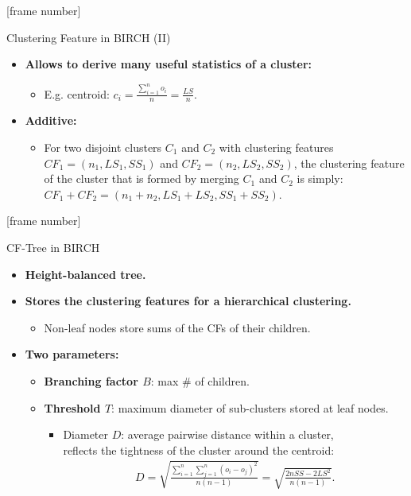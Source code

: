 \documentclass[aspectratio=169,t,xcolor=dvipsnames]{beamer}
\begin{document}
  { %
    [frame number]
    \begin{frame}{Clustering Feature in BIRCH (II)}
      \begin{itemize}
        \item \textbf{Allows to derive many useful statistics of a cluster:}
        \begin{itemize}
          \item E.g. centroid: $c_i = \frac{\sum_{i=1}^{n}o_i}{n} = \frac{LS}{n}$.
        \end{itemize}
        \item \textbf{Additive:}
        \begin{itemize}
          \item For two disjoint clusters $C_1$ and $C_2$ with clustering features $CF_1 = (n_1, LS_1, SS_1)$ and $CF_2 = (n_2, LS_2, SS_2)$, the clustering feature of the cluster that is formed by merging $C_1$ and $C_2$ is simply: $CF_1 + CF_2 = (n_1 + n_2, LS_1 + LS_2, SS_1 + SS_2)$.
        \end{itemize}
      \end{itemize}
    \end{frame}
  }

  { %
    [frame number]
    \begin{frame}{CF-Tree in BIRCH}
      \begin{itemize}
        \item \textbf{Height-balanced tree.}
        \item \textbf{Stores the clustering features for a hierarchical clustering.}
        \begin{itemize}
          \item Non-leaf nodes store sums of the CFs of their children.
        \end{itemize}
        \item \textbf{Two parameters:}
        \begin{itemize}
          \item \textbf{\color{airforceblue}Branching factor $B$}: max \# of children.
          \item \textbf{\color{airforceblue}Threshold $T$}: maximum diameter of sub-clusters stored at leaf nodes.
          \begin{itemize}
            \item Diameter $D$: average pairwise distance within a cluster, \\
            reflects the tightness of the cluster around the centroid:
            \begin{align}
              D = \sqrt{\frac{\sum_{i=1}^{n} \sum_{j=1}^{n} (o_i-o_j)^2}{n(n-1)}} = \sqrt{\frac{2nSS - 2LS^2}{n(n-1)}}.
            \end{align}
          \end{itemize}
        \end{itemize}
      \end{itemize}
    \end{frame}
  }
\end{document}
